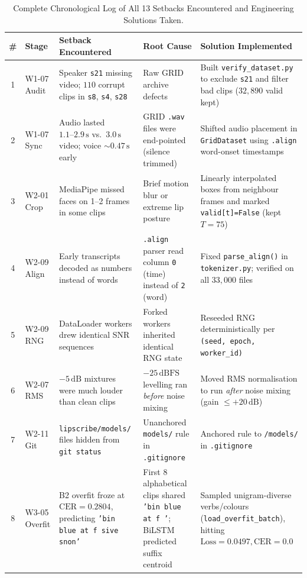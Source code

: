\documentclass[11pt,a4paper]{article}
\newcommand{\code}[1]{\texttt{\small #1}}
\begin{document}
\begin{table}[H]
\centering\scriptsize
\caption{Complete Chronological Log of All 13 Setbacks Encountered and Engineering Solutions Taken.}
\label{tab:setbacks}
\begin{tabularx}{\textwidth}{@{}cL{1.8cm}L{3.8cm}L{3.9cm}X@{}}
\toprule
{}\sffamily\bfseries \# & \sffamily\bfseries Stage & \sffamily\bfseries Setback Encountered & \sffamily\bfseries Root Cause & \sffamily\bfseries Solution Implemented \\
 & W1-07 Audit & Speaker \code{s21} missing video; $110$ corrupt clips in \code{s8}, \code{s4}, \code{s28} & Raw GRID archive defects & Built \code{verify\_dataset.py} to exclude \code{s21} and filter bad clips ($32{,}890$ valid kept) \\
2 & W1-07 Sync & Audio lasted $1.1\text{--}2.9\,\text{s}$ vs.\ $3.0\,\text{s}$ video; voice $\sim 0.47\,\text{s}$ early & GRID \code{.wav} files were end-pointed (silence trimmed) & Shifted audio placement in \code{GridDataset} using \code{.align} word-onset timestamps \\
3 & W2-01 Crop & MediaPipe missed faces on 1--2 frames in some clips & Brief motion blur or extreme lip posture & Linearly interpolated boxes from neighbour frames and marked \code{valid[t]=False} (kept $T=75$) \\
4 & W2-09 Align & Early transcripts decoded as numbers instead of words & \code{.align} parser read column \code{0} (time) instead of \code{2} (word) & Fixed \code{parse\_align()} in \code{tokenizer.py}; verified on all $33{,}000$ files \\
5 & W2-09 RNG & DataLoader workers drew identical SNR sequences & Forked workers inherited identical RNG state & Reseeded RNG deterministically per \code{(seed, epoch, worker\_id)} \\
6 & W2-07 RMS & $-5\,\text{dB}$ mixtures were much louder than clean clips & $-25\,\text{dBFS}$ levelling ran \emph{before} noise mixing & Moved RMS normalisation to run \emph{after} noise mixing (gain $\le +20\,\text{dB}$) \\
7 & W2-11 Git & \code{lipscribe/models/} files hidden from \code{git status} & Unanchored \code{models/} rule in \code{.gitignore} & Anchored rule to \code{/models/} in \code{.gitignore} \\
8 & W3-05 Overfit & B2 overfit froze at $\text{CER}=0.2804$, predicting \code{'bin blue at f sive snon'} & First 8 alphabetical clips shared \code{'bin blue at f '}; BiLSTM predicted suffix centroid & Sampled unigram-diverse verbs/colours (\code{load\_overfit\_batch}), hitting $\text{Loss}=0.0497, \text{CER}=0.0$ \\

\end{tabularx}
\end{table}
\end{document}
